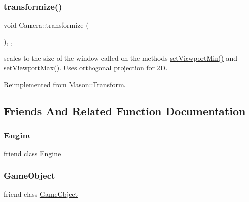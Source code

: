 \subsubsection{\texorpdfstring{transformize()}{transformize()}}
{\footnotesize\ttfamily void Camera\+::transformize (\begin{DoxyParamCaption}{ }\end{DoxyParamCaption})\hspace{0.3cm}{\ttfamily [override]}, {\ttfamily [protected]}, {\ttfamily [virtual]}}



scales to the size of the window called on the methods \hyperlink{class_mason_1_1_camera_aa630259d7e0c0124dec5c9aaf33b7160}{set\+Viewport\+Min()} and \hyperlink{class_mason_1_1_camera_a1f9a7896bb617d1402e3c4738324e1ea}{set\+Viewport\+Max()}. Uses orthogonal projection for 2D. 



Reimplemented from \hyperlink{class_mason_1_1_transform_a4dd61568d49044377f3312397ffdafd1}{Mason\+::\+Transform}.



\subsection{Friends And Related Function Documentation}
\hypertarget{class_mason_1_1_camera_a3e1914489e4bed4f9f23cdeab34a43dc}{}\label{class_mason_1_1_camera_a3e1914489e4bed4f9f23cdeab34a43dc} 
\subsubsection{\texorpdfstring{Engine}{Engine}}
{\footnotesize\ttfamily friend class \hyperlink{class_mason_1_1_engine}{Engine}\hspace{0.3cm}{\ttfamily [friend]}}

\hypertarget{class_mason_1_1_camera_a00df87c957d8f7ee0fc51f07a0542f4a}{}\label{class_mason_1_1_camera_a00df87c957d8f7ee0fc51f07a0542f4a} 
\subsubsection{\texorpdfstring{Game\+Object}{GameObject}}
{\footnotesize\ttfamily friend class \hyperlink{class_mason_1_1_game_object}{Game\+Object}\hspace{0.3cm}{\ttfamily [friend]}}



